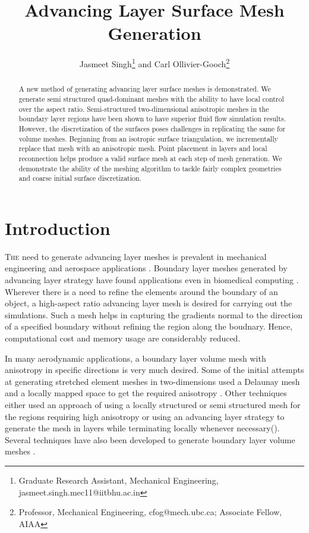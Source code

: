 \documentclass[conf]{new-aiaa}
\title{Advancing Layer Surface Mesh Generation}
\author{Jasmeet Singh\footnote{Graduate Research Assistant, Mechanical Engineering, jasmeet.singh.mec11@iitbhu.ac.in} and Carl Ollivier-Gooch\footnote{Professor, Mechanical Engineering, cfog@mech.ubc.ca; Associate Fellow, AIAA}}
\affil{University of British Columbia, Vancouver, British Columbia, V6T1Z4}
\begin{document}
\maketitle

\begin{abstract}
A new method of generating advancing layer surface meshes is demonstrated. We generate semi structured quad-dominant meshes with the ability to have local control over the aspect ratio. Semi-structured two-dimensional anisotropic meshes in the boundary layer regions have been shown to have superior fluid flow simulation results. However, the discretization of the surfaces poses challenges in replicating the same for volume meshes. Beginning from an isotropic surface triangulation, we incrementally replace that mesh with an anisotropic mesh. Point placement in layers and local reconnection helps produce a valid surface mesh at each step of mesh generation. We demonstrate the ability of the meshing algorithm to tackle fairly complex geometries and coarse initial surface discretization.
\end{abstract}

\section{Introduction}
\lettrine{T}{he} need to generate advancing layer meshes is prevalent in mechanical engineering and aerospace applications \cite{sbardella2000semi}. Boundary layer meshes generated by advancing layer strategy have found applications even in biomedical computing \cite{dyedov2009variational}. Wherever there is a need to refine the elements around the boundary of an object, a high-aspect ratio advancing layer mesh is desired for carrying out the simulations. Such a mesh helps in capturing the gradients normal to the direction of a specified boundary without refining the region along the boudnary. Hence, computational cost and memory usage are considerably reduced.%

In many aerodynamic applications, a boundary layer volume mesh with anisotropy in specific directions is very much desired. Some of the initial attempts at generating stretched element meshes in two-dimensions used a Delaunay mesh and a locally mapped space to get the required anisotropy \cite{mavriplis1990adaptive, castro1997anisotropic}. Other techniques either used an approach of using a locally structured or semi structured mesh for the regions requiring high anisotropy\cite{nakahashi1987fdm, kallinderis1996hybrid} or using an advancing layer strategy to generate the mesh in layers while terminating locally whenever necessary(\cite{pirzadeh1994unstructured, lohner1993matching, connell1995semistructured}). Several techniques have also been developed to generate boundary layer volume meshes \cite{garimella2000boundary, ito2002unstructured, sahni2008adaptive, ito2007multiple, aubry2009generation}.
\end{document}
